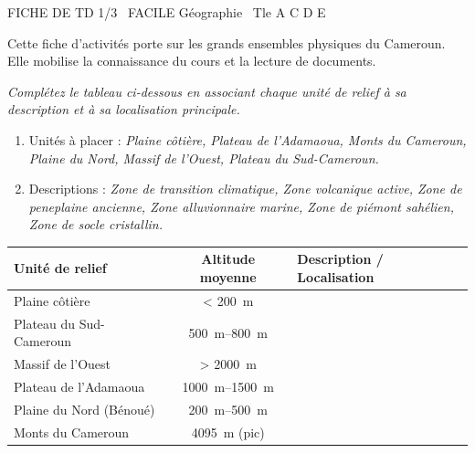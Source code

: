 \documentclass[11pt]{article}
\begin{document}
\begin{tcolorbox}[enhanced,colback=popink,colframe=popink,arc=10pt,boxrule=0pt,left=12pt,right=12pt,top=9pt,bottom=9pt]
{\color{white}\popxbold\small FICHE DE TD 1/3 \textbullet\ FACILE \hfill Géographie \textbullet\ Tle A C D E\par}
\end{tcolorbox}
\vspace{4pt}
Cette fiche d'activités porte sur les grands ensembles physiques du Cameroun. Elle mobilise la connaissance du cours et la lecture de documents.

\begin{exercice}
\emph{Complétez le tableau ci-dessous en associant chaque unité de relief à sa description et à sa localisation principale.}
\begin{enumerate}
    \item Unités à placer : \textit{Plaine côtière, Plateau de l'Adamaoua, Monts du Cameroun, Plaine du Nord, Massif de l'Ouest, Plateau du Sud-Cameroun.}
    \item Descriptions : \textit{Zone de transition climatique, Zone volcanique active, Zone de peneplaine ancienne, Zone alluvionnaire marine, Zone de piémont sahélien, Zone de socle cristallin.}
\end{enumerate}
\begin{tabularx}{\linewidth}{|X|c|X|}
\hline
\textbf{Unité de relief} & \textbf{Altitude moyenne} & \textbf{Description / Localisation} \\
\hline
Plaine côtière & < \SI{200}{\meter} & \\
\hline
Plateau du Sud-Cameroun & \SIrange{500}{800}{\meter} & \\
\hline
Massif de l'Ouest & > \SI{2000}{\meter} & \\
\hline
Plateau de l'Adamaoua & \SIrange{1000}{1500}{\meter} & \\
\hline
Plaine du Nord (Bénoué) & \SIrange{200}{500}{\meter} & \\
\hline
Monts du Cameroun & \SI{4095}{\meter} (pic) & \\
\hline
\end{tabularx}
\end{exercice}
\end{document}
